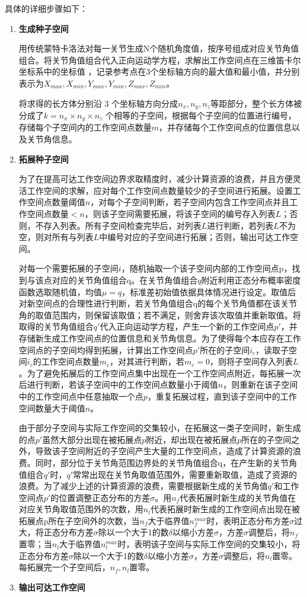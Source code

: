 具体的详细步骤如下：
\newpage
\begin{enumerate}
    \item \textbf{生成种子空间} 
    
    用传统蒙特卡洛法对每一关节生成N个随机角度值，按序号组成对应关节角值组合。将关节角值组合代入正向运动学方程，求解出工作空间点在三维笛卡尔坐标系中的坐标值 ，记录参考点在3个坐标轴方向的最大值和最小值，并分别表示为$X_{max},X_{min},Y_{max},Y_{min},Z_{max},Z_{min}$。
    
    将求得的长方体分别沿 3 个坐标轴方向分成$n_x,n_y,n_z$等距部分，整个长方体被分成了$k=n_x\times n_y\times n_z$ 个相等的子空间，根据每个子空间的位置进行编号，存储每个子空间内的工作空间点数量$m$，并存储每个工作空间点的位置信息以及关节角信息。
    \item \textbf{拓展种子空间}
    
    为了在提高可达工作空间边界求取精度时，减少计算资源的浪费，并且方便灵活工作空间的求解，应对每个工作空间点数量较少的子空间进行拓展。设置工作空间点数量阈值$n$，对每个子空间判断，若子空间内包含工作空间点并且工作空间点数量$<n$，则该子空间需要拓展，将该子空间的编号存入列表$L$；否则，不存入列表。所有子空间检查完毕后，对列表$L$进行判断，若列表$L$不为空，则对所有与列表$L$中编号对应的子空间进行拓展；否则，输出可达工作空间。
    
    对每一个需要拓展的子空间$i$，随机抽取一个该子空间内部的工作空间点p，找到与该点对应的关节角值组合q。在关节角值组合$q$附近利用正态分布概率密度函数选取随机值，均值$\mu=q$，标准差初始值依据具体情况进行设定。取值后对新空间点的合理性进行判断，若关节角值组合q的每个关节角值都在该关节角的取值范围内，则保留该取值；若不满足，则舍弃该次取值并重新取值。将取得的关节角值组合$q\prime$代入正向运动学方程，产生一个新的工作空间点$p\prime$，并存储新生成工作空间点的位置信息和关节角信息。为了使得每个本应存在工作空间点的子空间均得到拓展，计算出工作空间点$p\prime$所在的子空间$i_c$，读取子空间$i_c$的工作空间点数量$m_c$，对其进行判断，若$m_c=0$，则将子空间存入列表$L$。为了避免拓展后的工作空间点集中出现在一个工作空间点附近，每拓展一次后进行判断，若该子空间中的工作空间点数量小于阈值$n$，则重新在该子空间中的工作空间点中任意抽取一个点$p$，重复拓展过程，直到该子空间中的工作空间数量大于阈值$n$。

    由于部分子空间与实际工作空间的交集较小，在拓展这一类子空间时，新生成的点$p\prime$虽然大部分出现在被拓展点$p$附近，却出现在被拓展点$p$所在的子空间之外，导致该子空间附近的子空间产生大量的工作空间点，造成了计算资源的浪费。同时，部分位于关节角范围边界处的关节角值组合q，在产生新的关节角值组合$q\prime$时，$q\prime$常常出现在关节角取值范围外，需要重新取值，造成了资源的浪费。为了减少上述的计算资源的浪费，需要根据新生成的关节角值$q\prime$和工作空间点$p\prime$的位置调整正态分布的方差$\sigma$。用$n_f$代表拓展时新生成的关节角值在对应关节角取值范围外的次数，用$n_l$代表拓展时新生成的工作空间点出现在被拓展点p所在子空间外的次数，当$n_f$大于临界值$n_f^{max}$时，表明正态分布方差$\sigma$过大，将正态分布方差$\sigma$除以一个大于1的数$\delta$以缩小方差$\sigma$，方差$\sigma$调整后，将$n_f$置零；当$n_l$大于临界值$n_l^{max}$时，表明该子空间与实际工作空间的交集较小，将正态分布方差$\sigma$除以一个大于1的数$\delta$以缩小方差$\sigma$，方差$\sigma$调整后，将$n_l$置零。每拓展完一个子空间后，$n_f,n_l$置零。
    \item \textbf{输出可达工作空间}
    

\end{enumerate}
